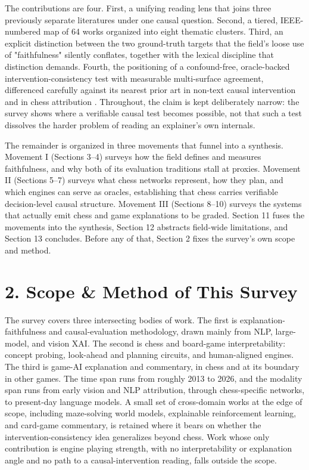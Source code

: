 \documentclass[conference]{IEEEtran}
\begin{document}
The contributions are four. First, a unifying reading lens that joins three previously separate literatures under one causal question. Second, a tiered, IEEE-numbered map of 64 works organized into eight thematic clusters. Third, an explicit distinction between the two ground-truth targets that the field's loose use of "faithfulness" silently conflates, together with the lexical discipline that distinction demands. Fourth, the positioning of a confound-free, oracle-backed intervention-consistency test with measurable multi-surface agreement, differenced carefully against its nearest prior art in non-text causal intervention \cite{ref32} and in chess attribution \cite{ref19}. Throughout, the claim is kept deliberately narrow: the survey shows where a verifiable causal test becomes possible, not that such a test dissolves the harder problem of reading an explainer's own internals.

The remainder is organized in three movements that funnel into a synthesis. Movement I (Sections 3--4) surveys how the field defines and measures faithfulness, and why both of its evaluation traditions stall at proxies. Movement II (Sections 5--7) surveys what chess networks represent, how they plan, and which engines can serve as oracles, establishing that chess carries verifiable decision-level causal structure. Movement III (Sections 8--10) surveys the systems that actually emit chess and game explanations to be graded. Section 11 fuses the movements into the synthesis, Section 12 abstracts field-wide limitations, and Section 13 concludes. Before any of that, Section 2 fixes the survey's own scope and method.

\section*{2. Scope \& Method of This Survey}
The survey covers three intersecting bodies of work. The first is explanation-faithfulness and causal-evaluation methodology, drawn mainly from NLP, large-model, and vision XAI. The second is chess and board-game interpretability: concept probing, look-ahead and planning circuits, and human-aligned engines. The third is game-AI explanation and commentary, in chess and at its boundary in other games. The time span runs from roughly 2013 to 2026, and the modality span runs from early vision and NLP attribution, through chess-specific networks, to present-day language models. A small set of cross-domain works at the edge of scope, including maze-solving world models, explainable reinforcement learning, and card-game commentary, is retained where it bears on whether the intervention-consistency idea generalizes beyond chess. Work whose only contribution is engine playing strength, with no interpretability or explanation angle and no path to a causal-intervention reading, falls outside the scope.
\end{document}
